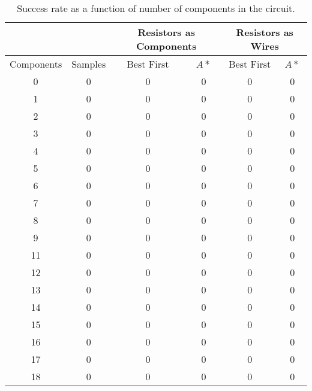 \begin{table}[H]
\begin{center}
\begin{singlespace}
\begin{tabular}{| c | c || c | c | c | c |}
\hline
 & & \multicolumn{2}{|c|}{Resistors as Components} & \multicolumn{2}{|c|}{
 Resistors as Wires} \\
\hline
Components & Samples & Best First & $A*$ & Best First & $A*$ \\
\hline\hline
0 & 0 & 0 & 0 & 0 & 0 \\
1 & 0 & 0 & 0 & 0 & 0 \\
2 & 0 & 0 & 0 & 0 & 0 \\
3 & 0 & 0 & 0 & 0 & 0 \\
4 & 0 & 0 & 0 & 0 & 0 \\
5 & 0 & 0 & 0 & 0 & 0 \\
6 & 0 & 0 & 0 & 0 & 0 \\
7 & 0 & 0 & 0 & 0 & 0 \\
8 & 0 & 0 & 0 & 0 & 0 \\
9 & 0 & 0 & 0 & 0 & 0 \\
11 & 0 & 0 & 0 & 0 & 0 \\
12 & 0 & 0 & 0 & 0 & 0 \\
13 & 0 & 0 & 0 & 0 & 0 \\
14 & 0 & 0 & 0 & 0 & 0 \\
15 & 0 & 0 & 0 & 0 & 0 \\
16 & 0 & 0 & 0 & 0 & 0 \\
17 & 0 & 0 & 0 & 0 & 0 \\
18 & 0 & 0 & 0 & 0 & 0 \\
\hline
\end{tabular}
\end{singlespace}
\end{center}
\caption{Success rate as a function of number of components in the circuit.}
\end{table}

